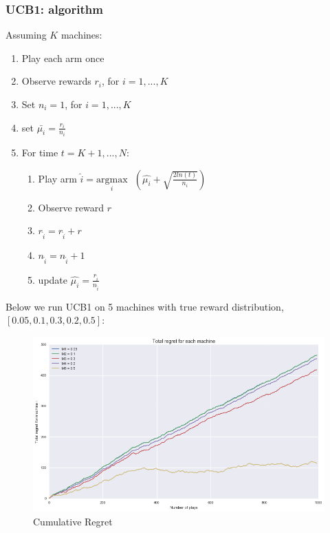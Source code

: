 \documentclass{article}
\begin{document}
\subsubsection{UCB1: algorithm}

Assuming $K$ machines:

\begin{enumerate}
\item Play each arm once
\item Observe rewards $r_i$, for $i = 1, ..., K$
\item Set $n_i = 1$, for $i = 1, ..., K$
\item set $\bar{\mu_{i}} = \frac{r_i}{n_i}$
\item For time $t = K+1, ..., N$:
	\begin{enumerate}
		\item Play arm $\hat{i} = \underset{i}{\text{argmax}}\text{ }(\hat{\mu_{i}} + \sqrt{\frac{2 ln (t)}{n_i}})$
		\item Observe reward $r$
		\item $r_{\hat{i}} = r_{\hat{i}} + r$
		\item $n_{\hat{i}} = n_{\hat{i}} + 1$
		\item update $\hat{\mu_{i}} = \frac{r_{\hat{i}}}{n_{\hat{i}}}$
	\end{enumerate}
\end{enumerate}

Below we run UCB1 on 5 machines with true reward distribution, $[0.05,0.1,0.3,0.2,0.5]$:

\begin{figure}[H]
\centering
\includegraphics[scale=0.5]{UCB_regret.png}
\caption{Cumulative Regret}
\end{figure}
\end{document}

